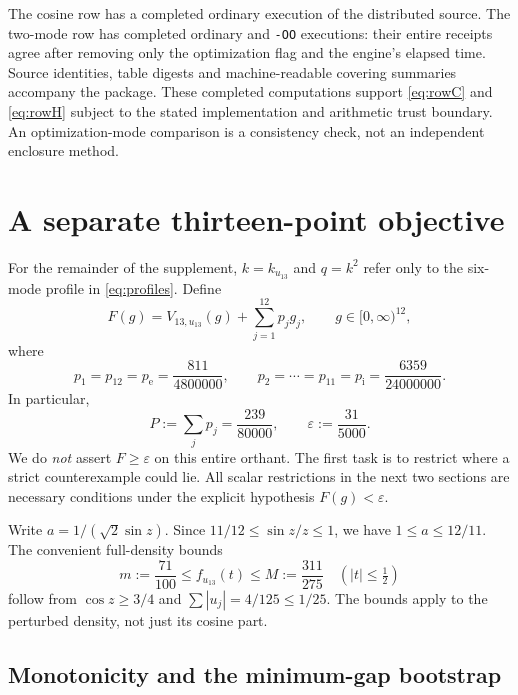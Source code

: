 \documentclass[11pt]{amsart}
\numberwithin{equation}{section}
\newcommand{\eps}{\varepsilon}
\newcommand{\pe}{p_{\mathrm e}}
\newcommand{\pint}{p_{\mathrm i}}
\begin{document}
The cosine row has a completed ordinary execution of the distributed
source. The two-mode row has completed ordinary and \texttt{-OO}
executions: their entire receipts agree after removing only the
optimization flag and the engine's elapsed time. Source identities,
table digests and machine-readable covering summaries accompany the
package. These completed computations support \eqref{eq:rowC} and
\eqref{eq:rowH} subject to the stated implementation and arithmetic
trust boundary. An optimization-mode comparison is a consistency
check, not an independent enclosure method.

\section{A separate thirteen-point objective}

For the remainder of the supplement, $k=k_{u_{13}}$ and $q=k^2$
refer only to the six-mode profile in \eqref{eq:profiles}. Define
\begin{equation}\label{eq:F13}
 F(g)=V_{13,u_{13}}(g)+\sum_{j=1}^{12}p_jg_j,
 \qquad g\in[0,\infty)^{12},
\end{equation}
where
\begin{equation}\label{eq:pressures13}
 p_1=p_{12}=\pe=\frac{811}{4800000},\qquad
 p_2=\cdots=p_{11}=\pint=\frac{6359}{24000000}.
\end{equation}
In particular,
\begin{equation}\label{eq:target13}
 P:=\sum_jp_j=\frac{239}{80000},\qquad
 \eps:=\frac{31}{5000}.
\end{equation}
We do \emph{not} assert $F\geq\eps$ on this entire orthant. The
first task is to restrict where a strict counterexample could lie.
All scalar restrictions in the next two sections are necessary
conditions under the explicit hypothesis $F(g)<\eps$.

Write $a=1/(\sqrt2\sin z)$. Since
$11/12\leq\sin z/z\leq1$, we have $1\leq a\leq12/11$.
The convenient full-density bounds
\begin{equation}\label{eq:densitybounds13}
 m:=\frac{71}{100}\leq f_{u_{13}}(t)\leq
 M:=\frac{311}{275}\quad(|t|\leq\tfrac12)
\end{equation}
follow from $\cos z\geq3/4$ and
$\sum|u_j|=4/125\leq1/25$. The bounds apply to the perturbed
density, not just its cosine part.

\subsection{Monotonicity and the minimum-gap bootstrap}
\end{document}
